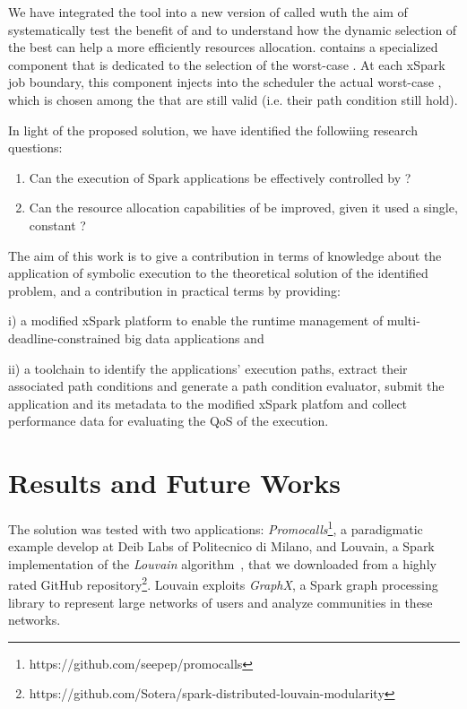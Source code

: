 We have integrated the tool into a new version of \cSpark called \tool wuth the aim of systematically test the benefit of \dSymb and to understand how the dynamic selection of the best \plan can help a more efficiently resources allocation. \tool contains a specialized   component that is dedicated to the selection of the worst-case \plan. At each xSpark job boundary, this component injects into the \cSpark scheduler the actual worst-case \plan, which is chosen among the \plans that are still valid (i.e. their path condition still hold). 

In light of the proposed solution, we have identified the followiing research questions:

\begin{enumerate}[\boldmath$RQ_1 : $] 
	\item Can the execution of Spark applications be effectively controlled by \dSymb?
	\item Can the resource allocation capabilities of \cSpark be improved, given it used a single, constant \plan?
\end{enumerate}

 The aim of this work is to give a contribution in terms of knowledge about the application of symbolic execution to the theoretical solution of the identified  problem, and a contribution in practical terms by providing: 
 
 i) a modified xSpark platform to enable the runtime management of multi-\plan deadline-constrained big data applications and 
 
 ii) a toolchain to identify the applications' execution paths,  extract their associated path conditions and generate a path condition evaluator, submit the application and its metadata to the modified xSpark platfom and collect performance data for evaluating the QoS of the execution. 

\section*{Results and Future Works}\label{sec:results_future_works}
The solution was tested with two applications:  \textit{Promocalls}\footnote{https://github.com/seepep/promocalls}, a paradigmatic example  develop at Deib Labs of Politecnico di Milano, and Louvain, a Spark implementation of the \textit{Louvain} algorithm~\cite{Louvain}, that we downloaded from a highly rated GitHub repository\footnote{https://github.com/Sotera/spark-distributed-louvain-modularity}. Louvain exploits \textit{GraphX}, a Spark graph processing library to represent large networks of users and analyze communities in these networks. 

